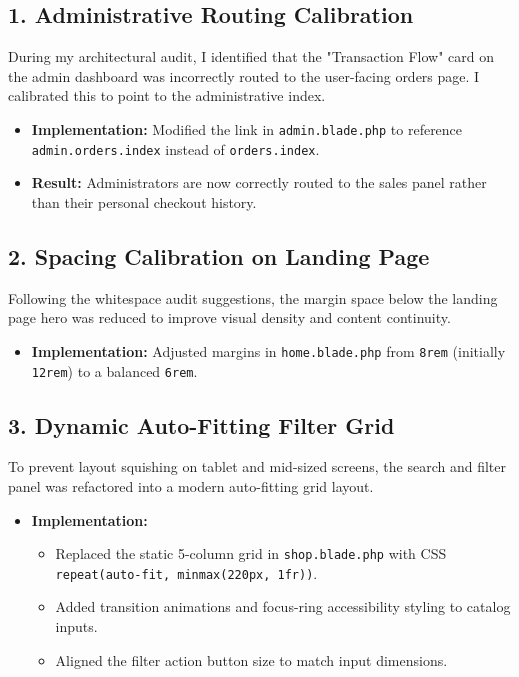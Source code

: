 \documentclass[12pt,a4paper]{article}
\begin{document}
\subsection{1. Administrative Routing Calibration}
During my architectural audit, I identified that the "Transaction Flow" card on the admin dashboard was incorrectly routed to the user-facing orders page. I calibrated this to point to the administrative index.
\begin{itemize}
    \item \textbf{Implementation:} Modified the link in \texttt{admin.blade.php} to reference \texttt{admin.orders.index} instead of \texttt{orders.index}.
    \item \textbf{Result:} Administrators are now correctly routed to the sales panel rather than their personal checkout history.
\end{itemize}

\subsection{2. Spacing Calibration on Landing Page}
Following the whitespace audit suggestions, the margin space below the landing page hero was reduced to improve visual density and content continuity.
\begin{itemize}
    \item \textbf{Implementation:} Adjusted margins in \texttt{home.blade.php} from \texttt{8rem} (initially \texttt{12rem}) to a balanced \texttt{6rem}.
\end{itemize}

\subsection{3. Dynamic Auto-Fitting Filter Grid}
To prevent layout squishing on tablet and mid-sized screens, the search and filter panel was refactored into a modern auto-fitting grid layout.
\begin{itemize}
    \item \textbf{Implementation:}
        \begin{itemize}
            \item Replaced the static 5-column grid in \texttt{shop.blade.php} with CSS \texttt{repeat(auto-fit, minmax(220px, 1fr))}.
            \item Added transition animations and focus-ring accessibility styling to catalog inputs.
            \item Aligned the filter action button size to match input dimensions.
        \end{itemize}
\end{itemize}
\end{document}
